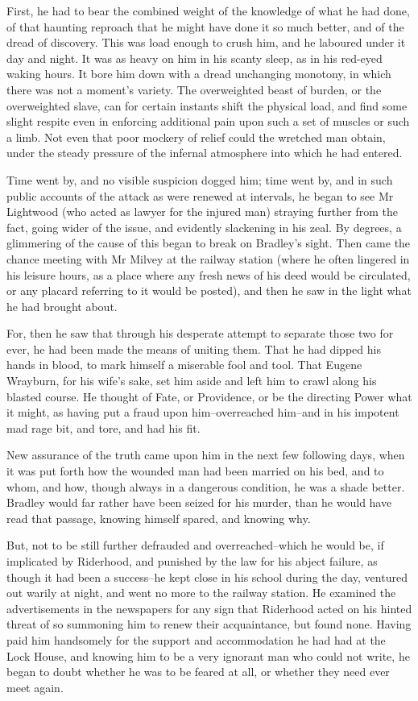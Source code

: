 First, he had to bear the combined weight of the knowledge of what he
had done, of that haunting reproach that he might have done it so much
better, and of the dread of discovery. This was load enough to crush
him, and he laboured under it day and night. It was as heavy on him in
his scanty sleep, as in his red-eyed waking hours. It bore him down with
a dread unchanging monotony, in which there was not a moment’s variety.
The overweighted beast of burden, or the overweighted slave, can for
certain instants shift the physical load, and find some slight respite
even in enforcing additional pain upon such a set of muscles or such
a limb. Not even that poor mockery of relief could the wretched man
obtain, under the steady pressure of the infernal atmosphere into which
he had entered.

Time went by, and no visible suspicion dogged him; time went by, and
in such public accounts of the attack as were renewed at intervals,
he began to see Mr Lightwood (who acted as lawyer for the injured man)
straying further from the fact, going wider of the issue, and evidently
slackening in his zeal. By degrees, a glimmering of the cause of this
began to break on Bradley’s sight. Then came the chance meeting with Mr
Milvey at the railway station (where he often lingered in his leisure
hours, as a place where any fresh news of his deed would be circulated,
or any placard referring to it would be posted), and then he saw in the
light what he had brought about.

For, then he saw that through his desperate attempt to separate those
two for ever, he had been made the means of uniting them. That he had
dipped his hands in blood, to mark himself a miserable fool and tool.
That Eugene Wrayburn, for his wife’s sake, set him aside and left him to
crawl along his blasted course. He thought of Fate, or Providence, or
be the directing Power what it might, as having put a fraud upon
him--overreached him--and in his impotent mad rage bit, and tore, and
had his fit.

New assurance of the truth came upon him in the next few following days,
when it was put forth how the wounded man had been married on his bed,
and to whom, and how, though always in a dangerous condition, he was a
shade better. Bradley would far rather have been seized for his murder,
than he would have read that passage, knowing himself spared, and
knowing why.

But, not to be still further defrauded and overreached--which he would
be, if implicated by Riderhood, and punished by the law for his abject
failure, as though it had been a success--he kept close in his school
during the day, ventured out warily at night, and went no more to the
railway station. He examined the advertisements in the newspapers for
any sign that Riderhood acted on his hinted threat of so summoning him
to renew their acquaintance, but found none. Having paid him handsomely
for the support and accommodation he had had at the Lock House, and
knowing him to be a very ignorant man who could not write, he began to
doubt whether he was to be feared at all, or whether they need ever meet
again.

